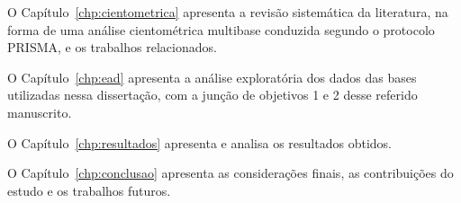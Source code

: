 O Capítulo~\ref{chp:cientometrica} apresenta a revisão sistemática da literatura, na forma de uma análise cientométrica multibase conduzida segundo o protocolo PRISMA, e os trabalhos relacionados.

O Capítulo~\ref{chp:ead} apresenta a análise exploratória dos dados das bases utilizadas nessa dissertação, com a junção de objetivos 1 e 2 desse referido manuscrito.

O Capítulo~\ref{chp:resultados} apresenta e analisa os resultados obtidos.

O Capítulo~\ref{chp:conclusao} apresenta as considerações finais, as contribuições do estudo e os trabalhos futuros.